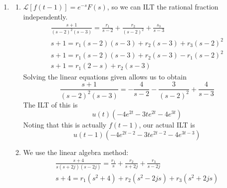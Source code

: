 \documentclass[12pt]{article}
\newcommand{\lt}[1]{\mathcal{L}\left[#1\right]}
\begin{document}
\begin{enumerate}
\begin{enumerate}
            \end{enumerate}
      \item \begin{enumerate}
                  \item $\lt{f(t-1)}=e^{-s}F(s)$,
                        so we can ILT the rational fraction independently.
                        \begin{gather*}
                              \frac{s+1}{(s-2)^2(s-3)} = \frac{r_1}{s-2}+\frac{r_2}{(s-2)^2}+\frac{s_3}{s-3} \\
                              s+1=r_1(s-2)(s-3)+r_2(s-3)+r_3(s-2)^2 \\
                              s+1=r_1(s-2)(s-3)+r_2(s-3)-r_1(s-2)^2 \\
                              s+1=r_1(2-s)+r_2(s-3)
                        \end{gather*}
                        Solving the linear equations given allows us to obtain
                        \[\frac{s+1}{(s-2)^2(s-3)}=-\frac{4}{s-2}-\frac{3}{(s-2)^2}+\frac{4}{s-3}\]
                        The ILT of this is
                        \[u(t)\left(-4e^{2t}-3te^{2t}-4e^{3t}\right)\]
                        Noting that this is actually $f(t-1)$, our actual ILT is
                        \[\boxed{u(t-1)\left(-4e^{2t-2}-3te^{2t-2}-4e^{3t-3}\right)}\]

                  \item We use the linear algebra method:
                        \begin{gather*}
                              \frac{s+4}{s(s+2j)(s-2j)}=\frac{r_1}{s}+\frac{r_2}{s+2j}+\frac{r_3}{s-2j} \\
                              s+4=r_1(s^2+4)+r_2(s^2-2js)+r_3(s^2+2js)
                        \end{gather*}


\end{enumerate}
\end{enumerate}
\end{document}
